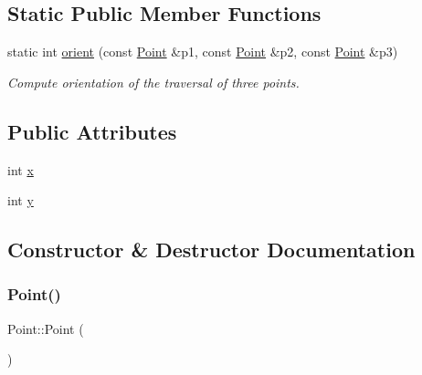 \subsection*{Static Public Member Functions}
\begin{DoxyCompactItemize}
\item 
static int \mbox{\hyperlink{classPoint_a16b12efe91681c389f0546a74fdf0886}{orient}} (const \mbox{\hyperlink{classPoint}{Point}} \&p1, const \mbox{\hyperlink{classPoint}{Point}} \&p2, const \mbox{\hyperlink{classPoint}{Point}} \&p3)
\begin{DoxyCompactList}\small\item\em Compute orientation of the traversal of three points. \end{DoxyCompactList}\end{DoxyCompactItemize}
\subsection*{Public Attributes}
\begin{DoxyCompactItemize}
\item 
int \mbox{\hyperlink{classPoint_a8c779e11e694b20e0946105a9f5de842}{x}}
\item 
int \mbox{\hyperlink{classPoint_a2e1b5fb2b2a83571f5c0bc0f66a73cf7}{y}}
\end{DoxyCompactItemize}


\subsection{Constructor \& Destructor Documentation}
\mbox{\label{classPoint_ad92f2337b839a94ce97dcdb439b4325a}} 
\subsubsection{\texorpdfstring{Point()}{Point()}\hspace{0.1cm}{\footnotesize\ttfamily [1/2]}}
{\footnotesize\ttfamily Point\+::\+Point (\begin{DoxyParamCaption}{ }\end{DoxyParamCaption})\hspace{0.3cm}{\ttfamily [inline]}}

\mbox{\label{classPoint_a810fc4436b6631341363abfedbd6bb97}} 
